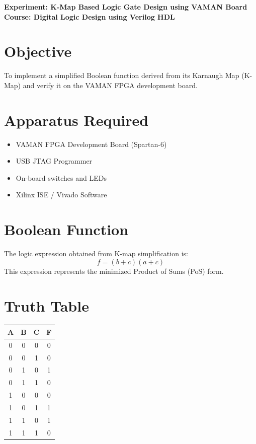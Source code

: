 \documentclass[a4paper,12pt]{article}
\begin{document}
\begin{center}
{\LARGE \textbf{Experiment: K-Map Based Logic Gate Design using VAMAN Board}} \\[6pt]
\textbf{Course: Digital Logic Design using Verilog HDL}
\end{center}

\section*{Objective}
To implement a simplified Boolean function derived from its Karnaugh Map (K-Map) and verify it on the VAMAN FPGA development board.

\section*{Apparatus Required}
\begin{itemize}
  \item VAMAN FPGA Development Board (Spartan-6)
  \item USB JTAG Programmer
  \item On-board switches and LEDs
  \item Xilinx ISE / Vivado Software
\end{itemize}

\section*{Boolean Function}
The logic expression obtained from K-map simplification is:
\[
f = (b + c)(a + \overline{c})
\]
This expression represents the minimized Product of Sums (PoS) form.

\section*{Truth Table}
\begin{center}
\begin{tabular}{ccc|c}
\toprule
A & B & C & F \\ 
\midrule
0 & 0 & 0 & 0 \\
0 & 0 & 1 & 0 \\
0 & 1 & 0 & 1 \\
0 & 1 & 1 & 0 \\
1 & 0 & 0 & 0 \\
1 & 0 & 1 & 1 \\
1 & 1 & 0 & 1 \\
1 & 1 & 1 & 0 \\
\bottomrule
\end{tabular}
\end{center}
\end{document}
